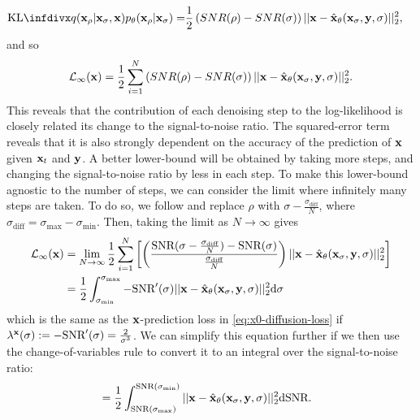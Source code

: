 \begin{align}
\kl{q(\rvx_{\rho} | \rvx_{\sigma}, \rvx)}{p_\theta(\rvx_{\rho} | \rvx_{\sigma})} = &\frac{1}{2} \left( SNR(\rho) - SNR(\sigma) \right) || \rvx - \hat{\rvx}_\theta(\rvx_\sigma, \rvy, \sigma) ||_2^2,
\end{align}
and so
\begin{align}
    \mathcal{L}_\infty({\mathbf{x}}) = \frac{1}{2} \sum_{i=1}^N \left( SNR(\rho) - SNR(\sigma) \right) || {\mathbf{x}} - \hat{{\mathbf{x}}}_\theta({\mathbf{x}}_\sigma, {\mathbf{y}}, \sigma) ||_2^2.
\end{align}
This reveals that the contribution of each denoising step to the log-likelihood is closely related its change to the signal-to-noise ratio. The squared-error term reveals that it is also strongly dependent on the accuracy of the prediction of ${\mathbf{x}}$ given ${\mathbf{x}}_t$ and ${\mathbf{y}}$. A better lower-bound will be obtained by taking more steps, and changing the signal-to-noise ratio by less in each step. To make this lower-bound agnostic to the number of steps, we can consider the limit where infinitely many steps are taken. To do so, we  follow \citet{kingma2021variational} and replace $\rho$ with $\sigma-\frac{\sigma_\text{diff}}{N}$, where $\sigma_\text{diff} = \sigma_\text{max}-\sigma_\text{min}$. Then, taking the limit as $N \rightarrow \infty$ gives 
\begin{align}
    \mathcal{L}_\infty({\mathbf{x}}) &= \lim_{N\rightarrow\infty} \frac{1}{2} \sum_{i=1}^N \left[ \left( \frac{\text{SNR}(\sigma-\frac{\sigma_\text{diff}}{N}) - \text{SNR}(\sigma)}{\frac{\sigma_\text{diff}}{N}} \right) || {\mathbf{x}} - \hat{{\mathbf{x}}}_\theta({\mathbf{x}}_\sigma, {\mathbf{y}}, \sigma) ||_2^2 \right] \\
    &= \frac{1}{2} \int_{\sigma_\text{min}}^{\sigma_\text{max}} -\text{SNR}'(\sigma) || {\mathbf{x}} - \hat{{\mathbf{x}}}_\theta({\mathbf{x}}_\sigma, {\mathbf{y}}, \sigma) ||_2^2 \mathrm{d}\sigma \label{eq:diffusion-elbo}
\end{align}
which is the same as the ${\mathbf{x}}$-prediction loss in \cref{eq:x0-diffusion-loss} if $\lambda^{\mathbf{x}}(\sigma) := - \text{SNR}'(\sigma) = \frac{2}{\sigma^3}$. We can simplify this equation further if we then use the change-of-variables rule to convert it to an integral over the signal-to-noise ratio:
\begin{align}
    &= \frac{1}{2} \int_{\text{SNR}(\sigma_\text{max})}^{\text{SNR}(\sigma_\text{min})} || {\mathbf{x}} - \hat{{\mathbf{x}}}_\theta({\mathbf{x}}_\sigma, {\mathbf{y}}, \sigma) ||_2^2 \mathrm{d}\text{SNR}. \label{eq:diffusion-integral-dsnr}
\end{align}
